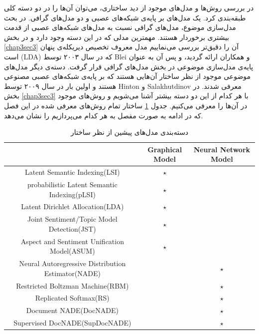 در بررسی‌ روش‌ها و مدل‌های موجود از دید ساختاری، می‌‌توان آن‌ها را در دو دسته کلی‌ طبقه‌بندی کرد. یک مدل‌های بر پایه‌ی شبکه‌های عصبی و دو مدل‌های گرافی‌. در بحث مدل‌سازی موضوع، مدل‌های گرافی‌ نسبت به مدل‌های شبکه‌های عصبی از قدمت بیشتری برخوردار هستند. مهمترین مدلی‌ که در این دسته وجود دارد و در بخش 
\ref{chap3sec3}
آن را دقیق‌تر بررسی‌ می‌‌نماییم مدل معروف تخصیص دیریکله‌ی پنهان است
 (LDA)
  که در سال ۲۰۰۳ توسط
Blei
و همکاران 
\cite{blei2003latent}
ارائه گردید، و پس آن به عنوان پایه‌ی مدل‌سازی موضوعی در بخش مدل‌های گرافی قرار گرفت. دسته‌ی دیگر مدل‌های موضوعی موجود از نظر ساختار آن‌هایی هستند که بر پایه‌ی شبکه‌های عصبی مصنوعی هستند و اولین بار در سال ۲۰۰۹ توسط
Hinton
و
Salakhutdinov \cite{hinton2009replicated}
معرفی‌ شدند. در بخش‌ 
\ref{chap3sec3}
با هر کدام از این دو دسته بیشتر آشنا می‌‌شویم و روش‌های موجود در آن‌ها را معرفی می‌کنیم. جدول
\ref{tabel3-1}
ساختار تمام روش‌های معرفی‌ شده در این فصل که در ادامه به صورت مفصل به هر کدام می‌پردازیم را نشان می‌‌دهد.
\begin{table}[!t]
	\centering
	\begin{latin}
		\begin{tabular}{|c|c|c|}
			\hline
			                               & Graphical Model & Neural Network Model \\ \hline
			          Latent Semantic Indexing(LSI)            &     $\star$     &  \\ \hline
			   probabilistic Latent Semantic Indexing(pLSI)    &     $\star$     &  \\ \hline
			         Latent Dirichlet Allocation(LDA)          &     $\star$     &  \\ \hline
			    Joint Sentiment/Topic Model Detection(JST)     &     $\star$     &  \\ \hline
			   Aspect and Sentiment Unification Model(ASUM)    &     $\star$     &  \\ \hline
			Neural Autoregressive Distribution Estimator(NADE) &                 &       $\star$        \\ \hline
			         Restricted Boltzman Machine(RBM)          &                 &       $\star$        \\ \hline
			              Replicated Softmax(RS)               &                 &       $\star$        \\ \hline
			              Document NADE(DocNADE)               &                 &       $\star$        \\ \hline
			          Supervised DocNADE(SupDocNADE)           &                 &       $\star$        \\ \hline
		\end{tabular}
	\end{latin}
	\caption{دسته‌بندی مدل‌های پیشین از نظر ساختار}
	\label{tabel3-1}
\end{table}


